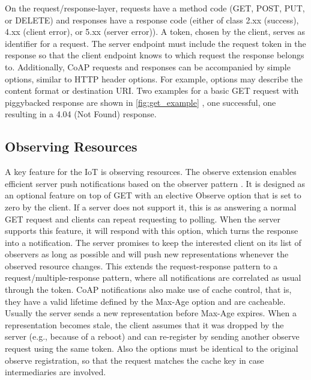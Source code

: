 On the request/response-layer, requests have a method code (GET, POST, PUT, or DELETE) and responses have a response code (either of class 2.xx (success), 4.xx (client error), or 5.xx (server error)). A token, chosen by the client, serves as identifier for a request. The server endpoint must include the request token in the response so that the client endpoint knows to which request the response belongs to. Additionally, CoAP requests and responses can be accompanied by simple options, similar to HTTP header options. For example, options may describe the content format or destination URI. Two examples for a basic GET request with piggybacked response are shown in \autoref{fig:get_example} \cite{coap_protocol}, one successful, one resulting in a 4.04 (Not Found) response.

\subsection{Observing Resources}\label{observe_resource}

A key feature for the IoT is observing resources. The observe extension enables efficient server push notifications based on the observer pattern \cite{kovatsch2015scalable}. It is designed as an optional feature on top of GET with an elective Observe option that is set to zero by the client. If a server does not support it, this is as answering a normal GET request and clients can repeat requesting to polling. When the server supports this feature, it will respond with this option, which turns the response into a notification. The server promises to keep the interested client on its list of observers as long as possible and will push new representations whenever the observed resource changes. This extends the request-response pattern to a request/multiple-response pattern, where all notifications are correlated as usual through the token. CoAP notifications also make use of cache control, that is, they have a valid lifetime defined by the Max-Age option and are cacheable. Usually the server sends a new representation before Max-Age expires. When a representation becomes stale, the client assumes that it was dropped by the server (e.g., because of a reboot) and can re-register by sending another observe request using the same token. Also the options must be identical to the original observe registration, so that the request matches the cache key in case intermediaries are involved.

